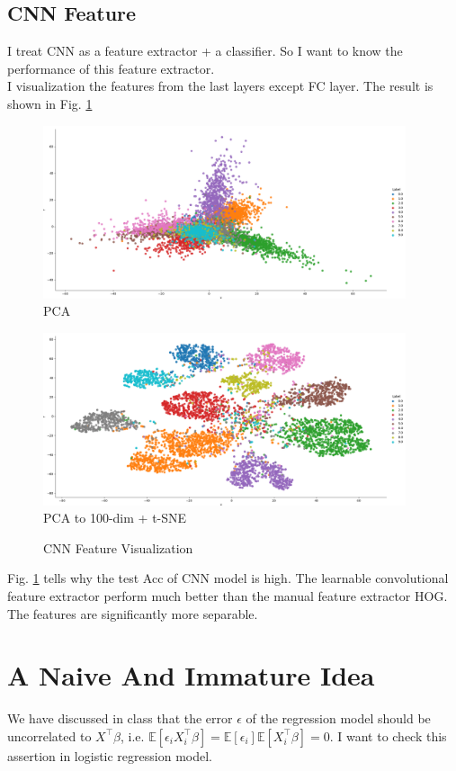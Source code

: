 \documentclass{article}
\begin{document}
\subsection{CNN Feature}
I treat CNN as a feature extractor + a classifier. So I want to know the performance of this feature extractor.\\
I visualization the features from the last layers except FC layer. The result is shown in Fig. \ref{cnnfeature}
\begin{figure}[H]
    \centering
    \begin{minipage}{0.48\textwidth}
        \centering
        \includegraphics[width=0.95\textwidth]{fig/pca/cnnpca.png}
        PCA
    \end{minipage}
    \begin{minipage}{0.48\textwidth}
        \centering
        \includegraphics[width=0.95\textwidth]{fig/pca/cnntsne.png}
        PCA to 100-dim + t-SNE
    \end{minipage}
    \caption{CNN Feature Visualization}
    \label{cnnfeature}
\end{figure}
Fig. \ref{cnnfeature} tells why the test Acc of CNN model is high. The learnable convolutional feature extractor perform much better than the manual feature extractor HOG. The features are significantly more separable. 
\section{A Naive And Immature Idea}
We have discussed in class that the error $\epsilon$ of the regression model should be uncorrelated to $X^\top\beta$, i.e. $\mathbb{E}[\epsilon_iX_i^\top\beta]=\mathbb{E}[\epsilon_i]\mathbb{E}[X_i^\top\beta]=0$. I want to check this assertion in logistic regression model. \\
\end{document}
